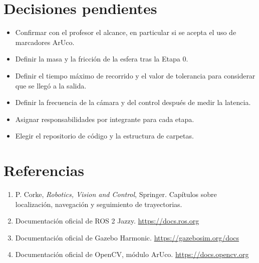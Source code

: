 \documentclass[11pt,a4paper]{article}
\begin{document}
\section{Decisiones pendientes}
\begin{itemize}
    \item Confirmar con el profesor el alcance, en particular si se acepta el uso de marcadores ArUco.
    \item Definir la masa y la fricción de la esfera tras la Etapa 0.
    \item Definir el tiempo máximo de recorrido y el valor de tolerancia para considerar que se llegó a la salida.
    \item Definir la frecuencia de la cámara y del control después de medir la latencia.
    \item Asignar responsabilidades por integrante para cada etapa.
    \item Elegir el repositorio de código y la estructura de carpetas.
\end{itemize}

\section*{Referencias}
\begin{enumerate}
    \item P. Corke, \emph{Robotics, Vision and Control}, Springer. Capítulos sobre localización, navegación y seguimiento de trayectorias.
    \item Documentación oficial de ROS 2 Jazzy. \url{https://docs.ros.org}
    \item Documentación oficial de Gazebo Harmonic. \url{https://gazebosim.org/docs}
    \item Documentación oficial de OpenCV, módulo ArUco. \url{https://docs.opencv.org}
\end{enumerate}
\end{document}
